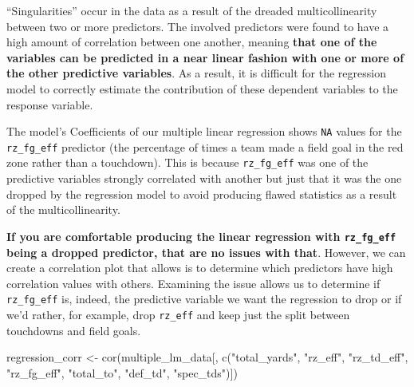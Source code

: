 \documentclass[
  letterpaper,
]{krantz}
\newenvironment{Shaded}{\begin{snugshade}}{\end{snugshade}}
\newcommand{\FunctionTok}[1]{\textcolor[rgb]{0.28,0.35,0.67}{#1}}
\newcommand{\NormalTok}[1]{\textcolor[rgb]{0.00,0.23,0.31}{#1}}
\newcommand{\OtherTok}[1]{\textcolor[rgb]{0.00,0.23,0.31}{#1}}
\newcommand{\StringTok}[1]{\textcolor[rgb]{0.13,0.47,0.30}{#1}}
\begin{document}
\begin{tcolorbox}[enhanced jigsaw, colback=white, leftrule=.75mm, breakable, colframe=quarto-callout-important-color-frame, bottomtitle=1mm, rightrule=.15mm, left=2mm, opacityback=0, bottomrule=.15mm, arc=.35mm, coltitle=black, colbacktitle=quarto-callout-important-color!10!white, toptitle=1mm, titlerule=0mm, title=\textcolor{quarto-callout-important-color}{\faExclamation}\hspace{0.5em}{Important}, toprule=.15mm, opacitybacktitle=0.6]

``Singularities'' occur in the data as a result of the dreaded
multicollinearity between two or more predictors. The involved
predictors were found to have a high amount of correlation between one
another, meaning \textbf{that one of the variables can be predicted in a
near linear fashion with one or more of the other predictive variables}.
As a result, it is difficult for the regression model to correctly
estimate the contribution of these dependent variables to the response
variable.

The model's Coefficients of our multiple linear regression shows
\texttt{NA} values for the \texttt{rz\_fg\_eff} predictor (the
percentage of times a team made a field goal in the red zone rather than
a touchdown). This is because \texttt{rz\_fg\_eff} was one of the
predictive variables strongly correlated with another but just that it
was the one dropped by the regression model to avoid producing flawed
statistics as a result of the multicollinearity.

\textbf{If you are comfortable producing the linear regression with
\texttt{rz\_fg\_eff}} \textbf{being a dropped predictor, that are no
issues with that}. However, we can create a correlation plot that allows
is to determine which predictors have high correlation values with
others. Examining the issue allows us to determine if
\texttt{rz\_fg\_eff} is, indeed, the predictive variable we want the
regression to drop or if we'd rather, for example, drop \texttt{rz\_eff}
and keep just the split between touchdowns and field goals.

\begin{Shaded}
\begin{Highlighting}[]
\NormalTok{regression\_corr }\OtherTok{\textless{}{-}}
  \FunctionTok{cor}\NormalTok{(multiple\_lm\_data[, }\FunctionTok{c}\NormalTok{(}\StringTok{"total\_yards"}\NormalTok{,}
                           \StringTok{"rz\_eff"}\NormalTok{, }\StringTok{"rz\_td\_eff"}\NormalTok{,}
                           \StringTok{"rz\_fg\_eff"}\NormalTok{, }\StringTok{"total\_to"}\NormalTok{,}
                           \StringTok{"def\_td"}\NormalTok{, }\StringTok{"spec\_tds"}\NormalTok{)])}


\end{Highlighting}
\end{Shaded}
\end{tcolorbox}
\end{document}
